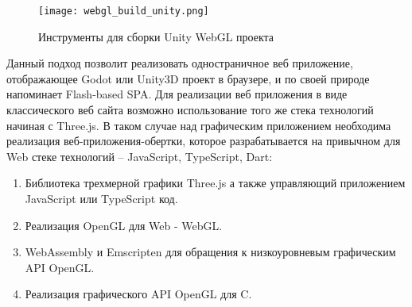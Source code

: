 \begin{figure}[ht]
\centering
  \texttt{[image: webgl\_build\_unity.png]}
  \caption{Инструменты для сборки Unity WebGL проекта}
  \label{figure:domain:webgl}
\end{figure}

Данный подход позволит реализовать одностраничное веб приложение, отображающее Godot или Unity3D проект в браузере, и по своей природе напоминает Flash-based SPA.
Для реализации веб приложения в виде классического веб сайта возможно использование того же стека технологий начиная с Three.js. В таком случае над графическим
приложением необходима реализация веб-приложения-обертки, которое разрабатывается на привычном для Web стеке технологий -- JavaScript, TypeScript, Dart:
\begin{enumerate}[label=\arabic*.]
\item Библиотека трехмерной графики Three.js а также управляющий приложением JavaScript или TypeScript код.
\item Реализация OpenGL для Web - WebGL.
\item WebAssembly и Emscripten для обращения к низкоуровневым графическим API OpenGL.
\item Реализация графического API OpenGL для C.
\end{enumerate}


